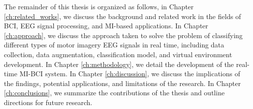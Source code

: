 The remainder of this thesis is organized as follows, in Chapter \ref{ch:related_works}, we discuss the background and related work in the fields of BCI, EEG signal processing, and MI-based applications.
In Chapter \ref{ch:approach}, we discuss the approach taken to solve the problem of classifying different types of motor imagery EEG signals in real time, including data collection, data augmentation, classification model, and virtual environment development.
In Chapter \ref{ch:methodology}, we detail the development of the real-time MI-BCI system. %
In Chapter \ref{ch:discussion}, we discuss the implications of the findings, potential applications, and limitations of the research.
In Chapter \ref{ch:conclusions}, we summarize the contributions of the thesis and outline directions for future research.
